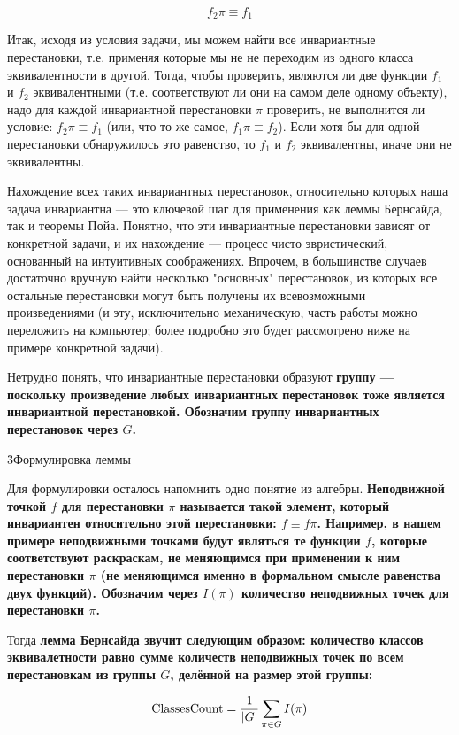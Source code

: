 $$ f_2 \pi \equiv f_1 $$

Итак, исходя из условия задачи, мы можем найти все инвариантные перестановки, т.е. применяя которые мы не не переходим из одного класса эквивалентности в другой. Тогда, чтобы проверить, являются ли две функции $f_1$ и $f_2$ эквивалентными (т.е. соответствуют ли они на самом деле одному объекту), надо для каждой инвариантной перестановки $\pi$ проверить, не выполнится ли условие: $f_2 \pi \equiv f_1$ (или, что то же самое, $f_1 \pi \equiv f_2$). Если хотя бы для одной перестановки обнаружилось это равенство, то $f_1$ и $f_2$ эквивалентны, иначе они не эквивалентны.

Нахождение всех таких инвариантных перестановок, относительно которых наша задача инвариантна --- это ключевой шаг для применения как леммы Бернсайда, так и теоремы Пойа. Понятно, что эти инвариантные перестановки зависят от конкретной задачи, и их нахождение --- процесс чисто эвристический, основанный на интуитивных соображениях. Впрочем, в большинстве случаев достаточно вручную найти несколько "основных" перестановок, из которых все остальные перестановки могут быть получены их всевозможными произведениями (и эту, исключительно механическую, часть работы можно переложить на компьютер; более подробно это будет рассмотрено ниже на примере конкретной задачи).

Нетрудно понять, что инвариантные перестановки образуют \bf{группу} --- поскольку произведение любых инвариантных перестановок тоже является инвариантной перестановкой. Обозначим \bf{группу инвариантных перестановок} через $G$.

\h3{Формулировка леммы}

Для формулировки осталось напомнить одно понятие из алгебры. \bf{Неподвижной точкой} $f$ для перестановки $\pi$ называется такой элемент, который инвариантен относительно этой перестановки: $f \equiv f \pi$. Например, в нашем примере неподвижными точками будут являться те функции $f$, которые соответствуют раскраскам, не меняющимся при применении к ним перестановки $\pi$ (не меняющимся именно в формальном смысле равенства двух функций). Обозначим через $I(\pi)$ \bf{количество неподвижных точек} для перестановки $\pi$.

Тогда \bf{лемма Бернсайда} звучит следующим образом: количество классов эквивалетности равно сумме количеств неподвижных точек по всем перестановкам из группы $G$, делённой на размер этой группы:

$$ {\rm ClassesCount} = \frac{1}{|G|} \sum_{\pi \in G} I(\pi) $$

